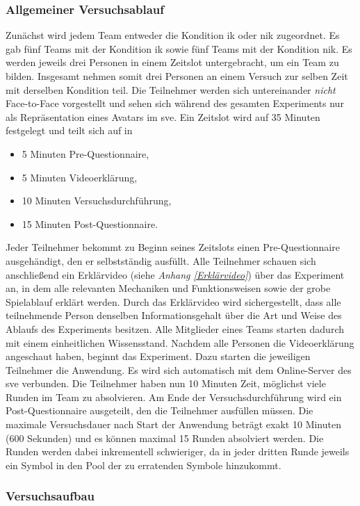 \documentclass[a4paper,11pt]{article}%
\renewcommand{\\}{\vspace*{0.5\baselineskip} \newline}
\begin{document}
	\subsubsection{Allgemeiner Versuchsablauf}
Zunächst wird jedem Team entweder die Kondition \ac{ik} oder \ac{nik} zugeordnet. Es gab fünf Teams mit der Kondition \ac{ik} sowie fünf Teams mit der Kondition \ac{nik}.
Es werden jeweils drei Personen in einem Zeitslot untergebracht, um ein Team zu bilden. Insgesamt nehmen somit drei Personen an einem Versuch zur selben Zeit mit derselben Kondition teil. Die Teilnehmer werden sich untereinander \textit{nicht} Face-to-Face vorgestellt und sehen sich während des gesamten Experiments nur als Repräsentation eines Avatars im \ac{sve}. 
Ein Zeitslot wird auf 35 Minuten festgelegt und teilt sich auf in
		\begin{itemize}
			\item 5 Minuten Pre-Questionnaire,
			\item 5 Minuten Videoerklärung,
			\item 10 Minuten Versuchsdurchführung,
			\item 15 Minuten Post-Questionnaire.
		\end{itemize}
Jeder Teilnehmer bekommt zu Beginn seines Zeitslots einen Pre-Questionnaire ausgehändigt, den er selbstständig ausfüllt. Alle Teilnehmer schauen sich anschließend ein Erklärvideo (siehe \textit{Anhang \ref{Erklärvideo}}) über das Experiment an, in dem alle relevanten Mechaniken und Funktionsweisen sowie der grobe Spielablauf erklärt werden. Durch das Erklärvideo wird sichergestellt, dass alle teilnehmende Person denselben Informationsgehalt über die Art und Weise des Ablaufs des Experiments besitzen. Alle Mitglieder eines Teams starten dadurch mit einem einheitlichen Wissensstand. Nachdem alle Personen die Videoerklärung angeschaut haben, beginnt das Experiment. Dazu starten die jeweiligen Teilnehmer die Anwendung. Es wird sich automatisch mit dem Online-Server des \ac{sve} verbunden. Die Teilnehmer haben nun 10 Minuten Zeit, möglichst viele Runden im Team zu absolvieren. Am Ende der Versuchsdurchführung wird ein Post-Questionnaire ausgeteilt, den die Teilnehmer ausfüllen müssen. Die maximale Versuchsdauer nach Start der Anwendung beträgt exakt 10 Minuten (600 Sekunden) und es können maximal 15 Runden absolviert werden. Die Runden werden dabei inkrementell schwieriger, da in jeder dritten Runde jeweils ein Symbol in den Pool der zu erratenden Symbole hinzukommt.

	\subsubsection{Versuchsaufbau}
\end{document}

